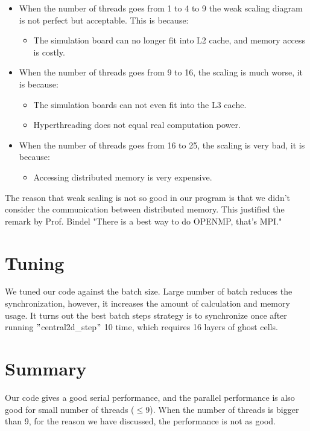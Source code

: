 \documentclass[11pt]{article}
\begin{document}
        \begin{itemize}
        	\item When the number of threads goes from 1 to 4 to 9 the weak scaling diagram is not perfect but acceptable. 
            This is because:
            	\begin{itemize}
					\item The simulation board can no longer fit into L2 cache, and memory access is costly.
				\end{itemize}
        	\item When the number of threads goes from 9 to 16, the scaling is much worse, it is because:
            	\begin{itemize}
					\item The simulation boards can not even fit into the L3 cache.
                    \item Hyperthreading does not equal real computation power.
				\end{itemize}
            \item When the number of threads goes from 16 to 25, the scaling is very bad, it is because:
            	\begin{itemize}
                    \item Accessing distributed memory is very expensive.
				\end{itemize}
		\end{itemize}
  
  		The reason that weak scaling is not so good in our program is that we didn't consider the communication between
        distributed memory. This justified the remark by Prof. Bindel "There is a best way to do OPENMP, that's MPI."

	\section{Tuning}
	We tuned our code against the batch size. Large number of batch reduces the synchronization, however, it increases
    the amount of calculation and memory usage. It turns out the best batch steps strategy is to synchronize once after
    running $"$central2d\_step$"$ 10 time, which requires 16 layers of ghost cells.
    
    \section{Summary}
    Our code gives a good serial performance, and the parallel performance is also good for small number of threads ($\leq$9).
    When the number of threads is bigger than 9, for the reason we have discussed, the performance is not as good.
    
\end{document}
